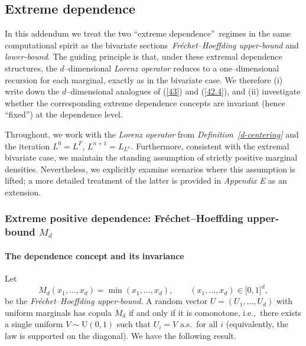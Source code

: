 \documentclass[onecolumn]{article}
\begin{document}
\subsection{Extreme dependence}

In this addendum we treat the two \textquotedblleft extreme
dependence\textquotedblright\ regimes in the same computational spirit as
the bivariate sections~\textit{Fr\'{e}chet--Hoeffding upper-bound} and 
\textit{lower-bound}. The guiding principle is that, under these extremal
dependence structures, the $d$--dimensional \textit{Lorenz operator} reduces
to a one--dimensional recursion for each marginal, exactly as in the
bivariate case. We therefore (i) write down the $d$--dimensional analogues
of (\ref{43}) and (\ref{42.4}), and (ii) investigate whether the
corresponding extreme dependence concepts are invariant (hence
\textquotedblleft fixed\textquotedblright ) at the dependence level.

Throughout, we work with the \textit{Lorenz operator} from \textit{%
Definition~\ref{d-centering}} and the iteration $L^{0}=L^{F}$, $%
L^{n+1}=L_{L^{n}}$. Furthermore, consistent with the extremal bivariate
case, we maintain the standing assumption of strictly positive marginal
densities. Nevertheless, we explicitly examine scenarios where this
assumption is lifted; a more detailed treatment of the latter is provided in 
\textit{Appendix E} as an extension.

\subsubsection{Extreme positive dependence: Fr\'{e}chet--Hoeffding
upper-bound $M_{d}$}

\paragraph{The dependence concept and its invariance}

Let 
\begin{equation}
M_{d}(x_{1},\dots ,x_{d})=\min (x_{1},\dots ,x_{d}),\qquad (x_{1},\dots
,x_{d})\in \lbrack 0,1]^{d},  \label{2002}
\end{equation}%
be the \textit{Fr\'{e}chet--Hoeffding upper-bound}. A random vector $%
U=(U_{1},\dots ,U_{d})$ with uniform marginals has copula $M_{d}$ if and
only if it is comonotone, i.e.,\ there exists a single uniform $V\sim 
\mathrm{U}(0,1)$ such that $U_{i}=V$ a.s.\ for all $i$ (equivalently, the
law is supported on the diagonal). We have the following result.
\end{document}
